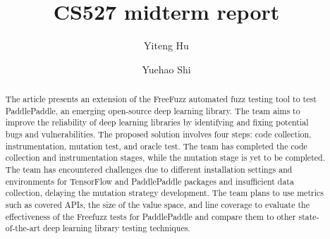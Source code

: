 \documentclass[sigconf]{acmart}
\begin{document}
\title{CS527 midterm report}

\author{Yiteng Hu}
\author{Yuehao Shi}
\authornotemark[1]

\renewcommand{\shortauthors}{Trovato et al.}

\begin{abstract}
  The article presents an extension of the FreeFuzz automated fuzz testing tool to test PaddlePaddle, 
  an emerging open-source deep learning library. The team aims to improve the reliability of deep learning 
  libraries by identifying and fixing potential bugs and vulnerabilities. The proposed solution involves 
  four steps: code collection, instrumentation, mutation test, and oracle test. The team has completed 
  the code collection and instrumentation stages, while the mutation stage is yet to be completed. 
  The team has encountered challenges due to different installation settings and environments for
   TensorFlow and PaddlePaddle packages and insufficient data collection, delaying the mutation strategy development.
    The team plans to use metrics such as covered APIs, the size of the value space, and line coverage to evaluate the effectiveness 
    of the Freefuzz tests for PaddlePaddle and compare them to other state-of-the-art deep learning library testing techniques.
\end{abstract}

\end{document}
